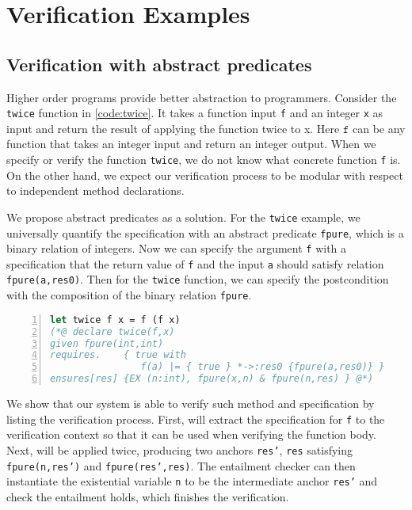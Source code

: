 
\chapter{Verification Examples}
\label{ch:evaluation}
\vspace{2em}

\section{Verification with abstract predicates}

Higher order programs provide better abstraction to programmers. Consider the 
\texttt{twice} function in \autoref{code:twice}. It takes a function input
\texttt{f} and an integer \texttt{x} as input and return the result of applying
the function twice to x. Here $\texttt{f}$ can be any function that takes an
integer input and return an integer output. When we specify or verify 
the function \texttt{twice}, we do not know what concrete function \texttt{f}
is. On the other hand, we expect our verification process to be modular
with respect to independent method declarations.

We propose abstract predicates as a solution. For the \texttt{twice} example, 
we universally quantify the specification with an abstract predicate
\texttt{fpure}, which is a binary relation of integers. Now we can specify
the argument \texttt{f} with a specification that the return value of \texttt{f}
and the input \texttt{a} should satisfy relation \texttt{fpure(a,res0)}. Then for the \texttt{twice} function, we can specify the postcondition with 
the composition of the binary relation \texttt{fpure}.


\begin{lstlisting}[language=Caml, mathescape=true, xleftmargin=2em, aboveskip=1em, xrightmargin=1em, numbers=left, frame = {TB}, caption={Higher order twice function}, label={code:twice} ]
let twice f x = f (f x)
(*@ declare twice(f,x)
given fpure(int,int)
requires.    { true with
                f(a) |= { true } *->:res0 {fpure(a,res0)} }
ensures[res] {EX (n:int), fpure(x,n) & fpure(n,res) } @*)
\end{lstlisting}

We show that our system is able to verify such method and specification by
listing the verification process. First,  will extract
the specification for \texttt{f} to the verification context so that it 
can be used when verifying the function body. Next,  
will be applied twice, producing two anchors \texttt{res'}, \texttt{res}
satisfying \texttt{fpure(n,res')} and \texttt{fpure(res',res)}. The entailment
checker can then instantiate the existential variable \texttt{n} to be
the intermediate anchor \texttt{res'} and check the entailment holds,
which finishes the verification.

